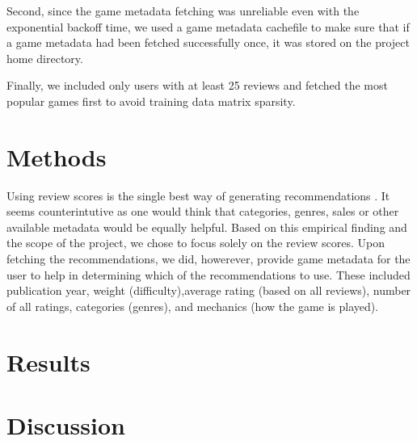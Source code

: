 \documentclass[a4paper,12pt,bibliography=totoc,numbers=noenddot,sfdefaults=false,abstract=true,notitlepage]{scrartcl} %
\begin{document}
	Second, since the game metadata fetching was unreliable even with the exponential backoff time, we used a game metadata cachefile to make sure that if a game metadata had been fetched successfully once, it was stored  on the project home directory.

	Finally, we included only users with at least 25 reviews and fetched the most popular games first to avoid training data matrix sparsity.
	
	
	\section{Methods}\label{methods}

	Using review scores is the single best way of generating recommendations \autocite{epsteinRangeWhyGeneralists2021}. It seems counterintutive as one would think that categories, genres, sales or other available metadata would be equally helpful. Based on this empirical finding and the scope of the project, we chose to focus solely on the review scores. Upon fetching the recommendations, we did, howerever, provide game metadata for the user to help in determining which of the recommendations to use. These included publication year, weight (difficulty),average rating (based on all reviews), number of all ratings, categories (genres), and mechanics (how the game is played). 





	
	
	
	\section{Results}\label{results}
	
	
	
	
	
	
	
	
	
	\section{Discussion}\label{discussion}
\end{document}
